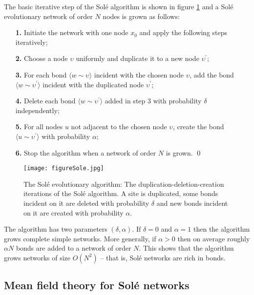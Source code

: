 \documentclass[12pt]{iopart}
\def\edge#1#2{{\langle #1{\sim}#2 \rangle}}
\begin{document}
The basic iterative step of the Sol\'e algorithm is shown in figure \ref{figure6S} and a
Sol\'e evolutionary network of order $N$ nodes is grown as follows:

\vspace{1mm}
\begin{enumerate}
\item[\bf 1.] Initiate the network with one node $x_0$ and apply the following steps iteratively;
\item[\bf 2.] Choose a node $\upsilon$ uniformly and duplicate it to a new node $\upsilon^\prime$;
\item[\bf 3.]  For each bond $\edge{w}{\upsilon}$ incident with the chosen node $\upsilon$, 
add the bond $\edge{w}{\upsilon^\prime}$ incident with the duplicated node
$\upsilon^\prime$;
\item[\bf 4.] Delete each bond $\edge{w}{\upsilon^\prime}$ added in step 3 with probability $\delta$
independently;
\item[\bf 5.] For all nodes $u$ not adjacent to the chosen node $\upsilon$, create the bond
$\edge{u}{\upsilon^\prime}$ with probability $\alpha$;
\item[\bf 6.] Stop the algorithm when a network of order $N$ is grown.
\qed
\end{enumerate}
\vspace{5mm}


\begin{figure}[t!]
 \centering
\texttt{[image: figureSole.jpg]}
  \caption{{The Sol\'e evolutionary algorithm:}
The duplication-deletion-creation iterations of the
Sol\'e algorithm.  A site is duplicated, some bonds incident on it are
deleted with probability $\delta$ and new bonds incident on it are
created with probability $\alpha$.}
\label{figure6S}
\end{figure}

The algorithm has two parameters $(\delta, \alpha)$.  If $\delta=0$ and $\alpha=1$
then the algorithm grows complete simple networks.  More generally, if $\alpha>0$ 
then on average roughly $\alpha N$ bonds are added to a network of order $N$.   This 
shows that the algorithm grows networks of size $O(N^2)$ -- that is, Sol\'e networks
are rich in bonds.


\subsection{Mean field theory for Sol\'e networks}
\end{document}
